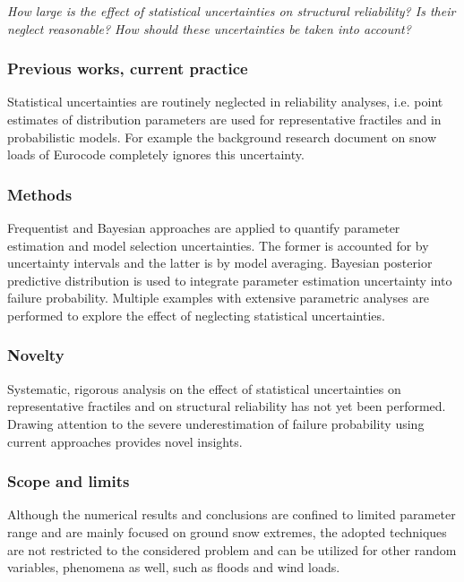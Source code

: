 \textit{How large is the effect of statistical uncertainties on structural reliability? Is their neglect reasonable? How should these uncertainties be taken into account?}
 
\subsubsection{Previous works, current practice}
Statistical uncertainties are routinely neglected in reliability analyses, i.e. point 
estimates of distribution parameters are used for representative fractiles and in 
probabilistic models. For example the background research document on snow loads of Eurocode completely ignores this uncertainty.

\subsubsection{Methods}
Frequentist and Bayesian approaches are applied to quantify parameter estimation and model selection uncertainties. The former is accounted for by uncertainty intervals and the latter is by model averaging. Bayesian posterior predictive distribution is used to integrate parameter estimation uncertainty into failure probability. Multiple examples with extensive parametric analyses are performed to explore the effect of neglecting statistical uncertainties.

\subsubsection{Novelty}
Systematic, rigorous analysis on the effect of statistical uncertainties on representative fractiles and on structural reliability has not yet been performed. Drawing attention to the severe underestimation of failure probability using current approaches provides novel insights.
 
\subsubsection{Scope and limits}
Although the numerical results and conclusions are confined to limited parameter range and are mainly focused on ground snow extremes, the adopted techniques are not restricted to the considered problem and can be utilized for other random variables, phenomena as well, such as floods and wind loads.
 
